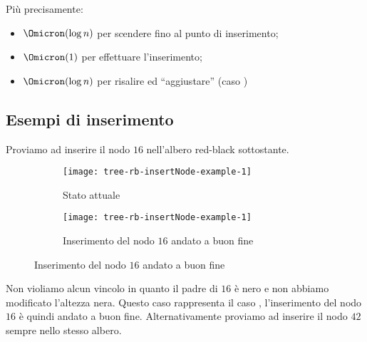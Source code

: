 Più precisamente:
\begin{itemize}
	\item \(\Omicron(\log n)\) per scendere fino al punto di inserimento;
	\item \(\Omicron(1)\) per effettuare l'inserimento;
	\item \(\Omicron(\log n)\) per risalire ed \enquote{aggiustare} (caso {\footnotesize{}})
\end{itemize}

\clearpage
\subsection*{Esempi di inserimento}

Proviamo ad inserire il nodo \(16\) nell'albero red-black sottostante.

\vspace{-5pt}
\begin{figure}[H]\centering
	\begin{subfigure}[t]{.48\linewidth}\centering
		\texttt{[image: tree-rb-insertNode-example-1]}
		\caption{Stato attuale}
	\end{subfigure}
	\hfill
	\begin{subfigure}[t]{.48\linewidth}\centering
		\texttt{[image: tree-rb-insertNode-example-1]}
		\caption{Inserimento del nodo \(16\) andato a buon fine}
	\end{subfigure}
\end{figure}

\vspace{-10pt}
Non violiamo alcun vincolo in quanto il padre di \(16\) è nero e non abbiamo modificato l'altezza nera.
Questo caso rappresenta il caso {\footnotesize{}}, l'inserimento del nodo \(16\) è quindi andato a buon fine.
Alternativamente proviamo ad inserire il nodo \(42\) sempre nello stesso albero.

